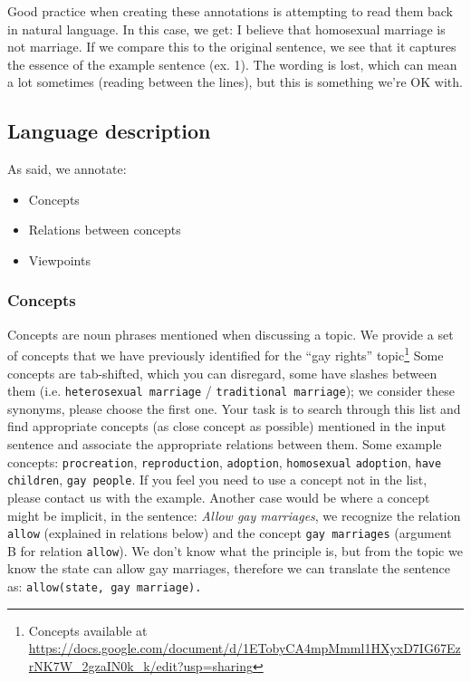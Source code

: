 Good practice when creating these annotations is attempting to read them back
in natural language. In this case, we get: I believe that homosexual marriage
is not marriage.  If we compare this to the original sentence, we see that it
captures the essence of the example sentence (ex. 1). The wording is lost,
which can mean a lot sometimes (reading between the lines), but this is
something we’re OK with.

\subsection{Language description}

As said, we annotate:
\begin{itemize}
\item Concepts
\item Relations between concepts
\item Viewpoints
\end{itemize}

\subsubsection{Concepts}

Concepts are noun phrases mentioned when discussing a topic. We provide a set
of concepts that we have previously identified for the ``gay rights'' topic\footnote{
Concepts available at 
\url{https://docs.google.com/document/d/1ETobyCA4mpMmml1HXyxD7IG67EzrNK7W_2gzaIN0k_k/edit?usp=sharing}
}
Some concepts are tab-shifted, which you can disregard, some have
slashes between them (i.e. \texttt{heterosexual marriage} / \texttt{traditional marriage}); we
consider these synonyms, please choose the first one. Your task is to search
through this list and find appropriate concepts (as close concept as possible)
mentioned in the input sentence and associate the appropriate relations between
them. Some example concepts: \texttt{procreation}, \texttt{reproduction}, \texttt{adoption}, \texttt{homosexual}
\texttt{adoption}, \texttt{have children}, \texttt{gay people}. 
If you feel you need to use a concept not
in the list, please contact us with the example. Another case would be where a
concept might be implicit, in the sentence: \textit{Allow gay marriages}, we recognize
the relation \texttt{allow} (explained in relations below) and the concept \texttt{gay marriages}
(argument B for relation \texttt{allow}).  We don’t know what the principle is, but from
the topic we know the state can allow gay marriages, therefore we can translate
the sentence as: \texttt{allow(state, gay marriage).}

